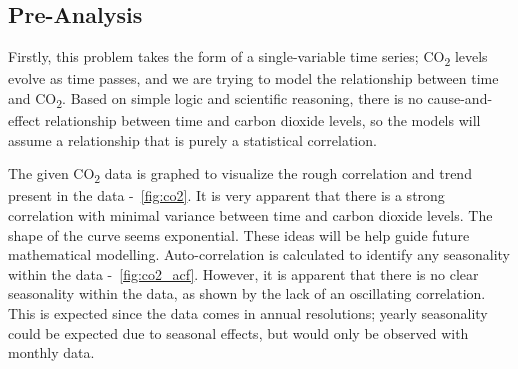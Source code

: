 \documentclass{mcmthesis}
\begin{document}
    \subsection{Pre-Analysis}
    Firstly, this problem takes the form of a single-variable time series; CO\textsubscript{2} levels evolve as time passes, and we are trying to model the relationship between time and CO\textsubscript{2}.
    Based on simple logic and scientific reasoning, there is no cause-and-effect relationship between time and carbon dioxide levels, so the models will assume a relationship that is purely a statistical correlation.

    The given CO\textsubscript{2} data is graphed to visualize the rough correlation and trend present in the data -~\ref{fig:co2}. It is very apparent that there is a strong correlation with minimal variance between time and carbon dioxide levels. The shape of the curve seems exponential. These ideas will be help guide future mathematical modelling.
    Auto-correlation is calculated to identify any seasonality within the data -~\ref{fig:co2_acf}. However, it is apparent that there is no clear seasonality within the data, as shown by the lack of an oscillating correlation. This is expected since the data comes in annual resolutions; yearly seasonality could be expected due to seasonal effects, but would only be observed with monthly data.
\end{document}
